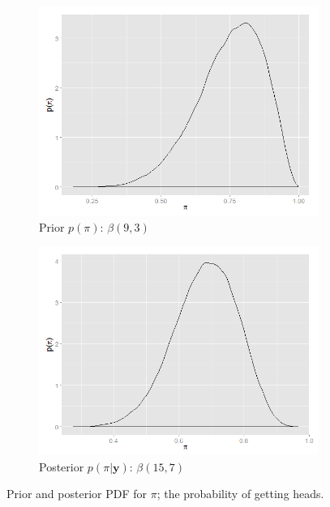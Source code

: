 \begin{figure}
\centering
	\begin{subfigure}[b]{0.45\textwidth}
		\includegraphics[width=\textwidth]{mainmatter/chapter_2_bayesian_paradigm/beta_prior.png}
        \caption{Prior $p(\pi)$: $\beta(9,3)$}
        \label{subfig : toy_problem_prior}
	\end{subfigure}
    	\begin{subfigure}[b]{0.45\textwidth}
		\includegraphics[width=\textwidth]{mainmatter/chapter_2_bayesian_paradigm/beta_posterior.png}
        \caption{Posterior $p(\pi|\boldsymbol{y})$: $\beta(15,7)$}
        \label{subfig : toy_problem_posterior}
	\end{subfigure}
\caption{Prior and posterior PDF for $\pi$; the probability of getting heads.}
\end{figure}

